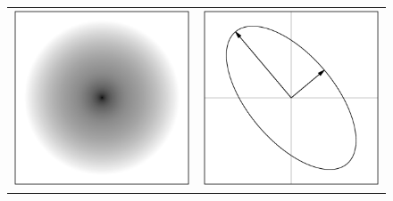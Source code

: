 \documentclass[12pt,pdftex,preprint]{aastex}
\newlength{\figurewidth}
\begin{document}
\clearpage
\begin{figure}
\setlength{\figurewidth}{0.33\textwidth}
\begin{tabular}{@{}c@{}c@{}}
\includegraphics[width=\figurewidth]{trdemo-01} &
\includegraphics[width=\figurewidth]{trdemo-02} \\

\end{tabular}
\end{figure}
\end{document}
